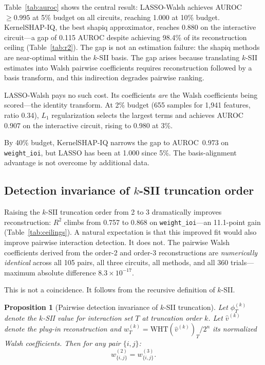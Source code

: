 \documentclass[11pt]{article}
\newtheorem{proposition}{Proposition}
\begin{document}
Table~\ref{tab:auroc} shows the central result: LASSO-Walsh achieves
AUROC~$\geq 0.995$ at 5\% budget on all circuits, reaching 1.000 at
10\% budget. KernelSHAP-IQ, the best shapiq approximator, reaches
0.880 on the interactive circuit---a gap of 0.115 AUROC despite
achieving 98.4\% of its reconstruction ceiling
(Table~\ref{tab:r2}). The gap is not an estimation failure: the
shapiq methods are near-optimal within the $k$-SII basis. The gap
arises because translating $k$-SII estimates into Walsh pairwise
coefficients requires reconstruction followed by a basis transform,
and this indirection degrades pairwise ranking.

LASSO-Walsh pays no such cost. Its coefficients \emph{are} the Walsh
coefficients being scored---the identity transform. At 2\% budget
(655 samples for 1{,}941 features, ratio 0.34), $L_1$ regularization
selects the largest terms and achieves AUROC~$0.907$ on the
interactive circuit, rising to 0.980 at 3\%.

By 40\% budget, KernelSHAP-IQ narrows the gap to AUROC~$0.973$
on \texttt{weight\_ioi}, but LASSO has been at 1.000 since 5\%.
The basis-alignment advantage is not overcome by additional data.


\subsection{Detection invariance of $k$-SII truncation order}
\label{sec:invariance}

Raising the $k$-SII truncation order from 2 to 3 dramatically
improves reconstruction: $R^2$ climbs from 0.757 to 0.868 on
\texttt{weight\_ioi}---an 11.1-point gain (Table~\ref{tab:ceilings}).
A natural expectation is that this improved fit would also improve
pairwise interaction detection. It does not. The pairwise Walsh
coefficients derived from the order-2 and order-3 reconstructions
are \emph{numerically identical} across all 105 pairs, all three
circuits, all methods, and all 360 trials---maximum absolute
difference $8.3 \times 10^{-17}$.

This is not a coincidence. It follows from the recursive definition
of $k$-SII.

\begin{proposition}[Pairwise detection invariance of $k$-SII truncation]
\label{prop:invariance}
Let $\phi^{(k)}_T$ denote the $k$-SII value for interaction set $T$
at truncation order $k$. Let $\hat{v}^{(k)}$ denote the plug-in
reconstruction and $w^{(k)}_T = \text{WHT}(\hat{v}^{(k)})_T / 2^n$
its normalized Walsh coefficients. Then for any pair $\{i,j\}$:
\[
  w^{(2)}_{\{i,j\}} = w^{(3)}_{\{i,j\}}.
\]
\end{proposition}
\end{document}
